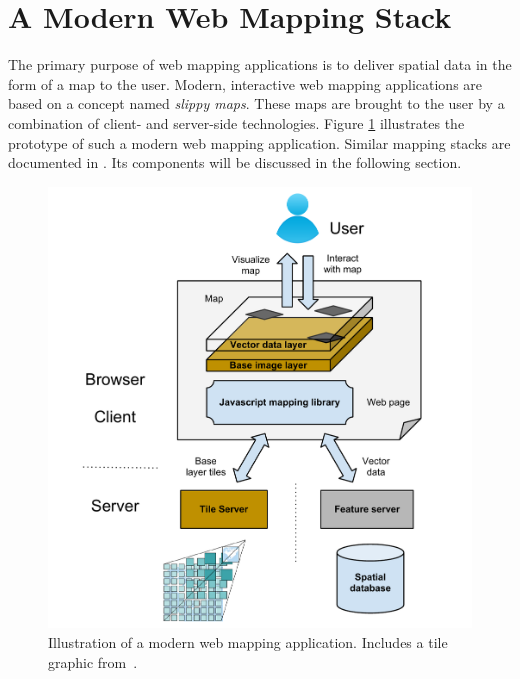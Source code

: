 
%
%

\section{A Modern Web Mapping Stack}

The primary purpose of web mapping applications is to deliver spatial data in the form of a map to the user. Modern, interactive web mapping applications are based on a concept named \textit{slippy maps}. These maps are brought to the user by a combination of client- and server-side technologies. Figure \ref{fig:web-mapping-stack} illustrates the prototype of such a modern web mapping application. Similar mapping stacks are documented in 
\cite{Schuetze07smart, mitchell2008web, Miler10webis, McArdle10arch}. Its components will be discussed in the following section.


\begin{figure}[h]
  \begin{center}
    \includegraphics[width=1\textwidth]{figures/web_mapping_stack.pdf}
    \caption{Illustration of a modern web mapping application. Includes a tile graphic from~\cite{web:cubeservtiles}.}
    \label{fig:web-mapping-stack}
  \end{center}
\end{figure}


